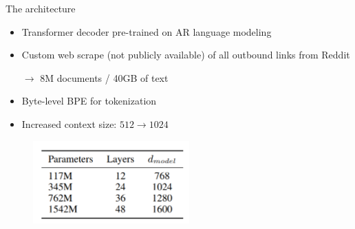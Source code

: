 
\begin{frame}{The architecture}

\vfill

\begin{itemize}
	\item Transformer decoder pre-trained on AR language modeling
	\item Custom web scrape (not publicly available) of all outbound links from Reddit
	\item[$\to$] 8M documents / 40GB of text
	\item Byte-level BPE for tokenization
	\item Increased context size: $512 \to 1024$
\end{itemize}

\begin{figure}
\centering
\includegraphics[width = 6cm]{figure/72-gpt2-size.png}\\ 
\end{figure}

\vfill

\end{frame}


